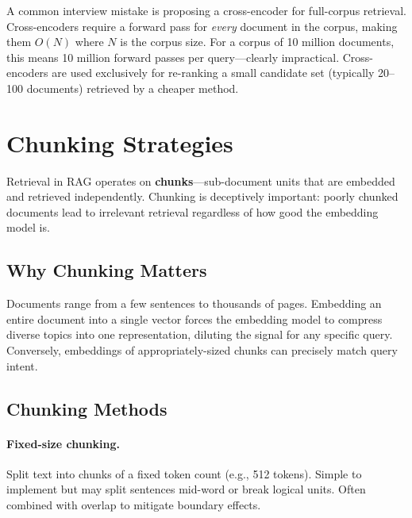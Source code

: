\begin{warningbox}
A common interview mistake is proposing a cross-encoder for full-corpus
retrieval.  Cross-encoders require a forward pass for \emph{every} document in
the corpus, making them $O(N)$ where $N$ is the corpus size.  For a corpus of
10 million documents, this means 10 million forward passes per query---clearly
impractical.  Cross-encoders are used exclusively for re-ranking a small
candidate set (typically 20--100 documents) retrieved by a cheaper method.
\end{warningbox}


\section{Chunking Strategies}
\label{sec:chunking}

Retrieval in RAG operates on \textbf{chunks}---sub-document units that are
embedded and retrieved independently.  Chunking is deceptively important:
poorly chunked documents lead to irrelevant retrieval regardless of how good
the embedding model is.

\subsection{Why Chunking Matters}

Documents range from a few sentences to thousands of pages.  Embedding an
entire document into a single vector forces the embedding model to compress
diverse topics into one representation, diluting the signal for any specific
query.  Conversely, embeddings of appropriately-sized chunks can precisely
match query intent.

\subsection{Chunking Methods}

\paragraph{Fixed-size chunking.}
Split text into chunks of a fixed token count (e.g., 512 tokens).  Simple to
implement but may split sentences mid-word or break logical units.  Often
combined with overlap to mitigate boundary effects.

